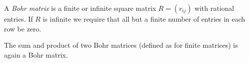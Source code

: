 A \textit{Bohr matrix} is a finite or infinite square matrix $R = (r_{ij})$ with rational entries. If $R$ is infinite we require that all but a finite number of entries in each row be zero.

The sum and product of two Bohr matrices (defined as for finite matrices) is again a Bohr matrix.
